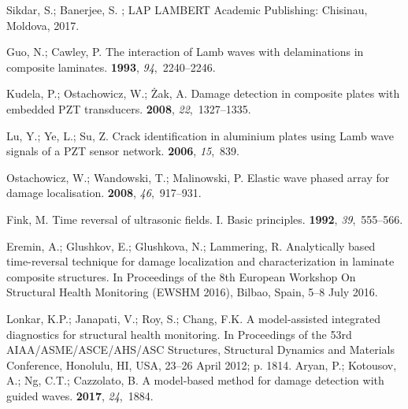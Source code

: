 \documentclass[sensors,article,accept,moreauthors,pdftex]{Definitions/mdpi}
\begin{document}
\begin{thebibliography}{999}
Sikdar, S.; Banerjee, S.
; LAP LAMBERT Academic
  Publishing: Chisinau, Moldova, 2017.%

Guo, N.; Cawley, P.
\newblock The interaction of {Lamb} waves with delaminations in composite
  laminates.
 {\bf 1993}, {\em 94},~2240--2246.

Kudela, P.; Ostachowicz, W.; {\.Z}ak, A.
\newblock Damage detection in composite plates with embedded PZT transducers.
 {\bf 2008}, {\em 22},~1327--1335.

Lu, Y.; Ye, L.; Su, Z.
\newblock Crack identification in aluminium plates using Lamb wave signals of a
  {PZT} sensor network.
 {\bf 2006}, {\em 15},~839.

Ostachowicz, W.; Wandowski, T.; Malinowski, P.
\newblock Elastic wave phased array for damage localisation.
 {\bf 2008}, {\em 46},~917--931.

Fink, M.
\newblock Time reversal of ultrasonic fields. I. Basic principles.
 {\bf 1992}, {\em 39},~555--566.

Eremin, A.; Glushkov, E.; Glushkova, N.; Lammering, R.
\newblock Analytically based time-reversal technique for damage localization
  and characterization in laminate composite structures.
\newblock  In Proceedings of the 8th European Workshop On Structural Health Monitoring
  (EWSHM 2016), Bilbao, Spain, 5--8 July 2016.%

Lonkar, K.P.; Janapati, V.; Roy, S.; Chang, F.K.
\newblock A model-assisted integrated diagnostics for structural health
  monitoring.
\newblock In Proceedings of the 53rd AIAA/ASME/ASCE/AHS/ASC Structures, Structural Dynamics and
  Materials Conference, Honolulu, HI, USA, 23--26 April 2012; p. 1814.%
Aryan, P.; Kotousov, A.; Ng, C.T.; Cazzolato, B.
\newblock A model‐based method for damage detection with guided waves.
 {\bf 2017}, {\em 24},~1884.


\end{thebibliography}
\end{document}
